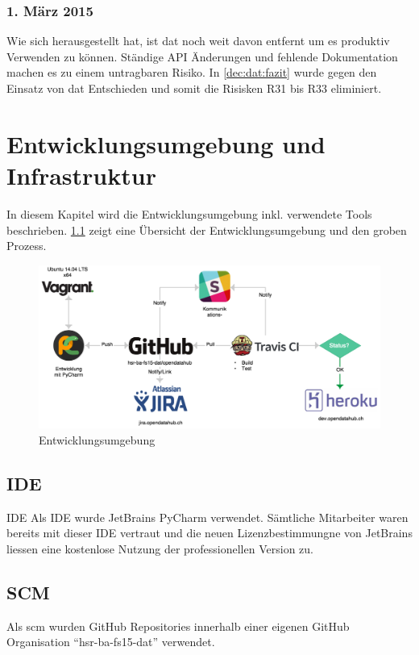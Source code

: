 \subsection{1. März 2015}

Wie sich herausgestellt hat, ist \gls{dat} noch weit davon entfernt um es produktiv Verwenden zu können. Ständige API Änderungen und fehlende Dokumentation machen es zu einem untragbaren Risiko. In \vref{dec:dat:fazit} wurde gegen den Einsatz von \gls{dat} Entschieden und somit die Risisken R31 bis R33 eliminiert.



\chapter{Entwicklungsumgebung und Infrastruktur}
In diesem Kapitel wird die Entwicklungsumgebung inkl. verwendete Tools beschrieben. \cref{fig:pm:entwicklungsumgebung} zeigt eine Übersicht der Entwicklungsumgebung und den groben Prozess.

\begin{figure}[H]
	\centering
	\includegraphics[width=\linewidth]{fig/entwicklungsumgebung}
	\caption{Entwicklungsumgebung}
	\label{fig:pm:entwicklungsumgebung}
\end{figure}

\section{IDE}
\begin{decision}{IDE}
	Als IDE wurde JetBrains PyCharm verwendet. Sämtliche Mitarbeiter waren bereits mit dieser IDE vertraut und die neuen Lizenzbestimmungne von JetBrains liessen eine kostenlose Nutzung der professionellen Version zu.

\end{decision}
\section{SCM}
Als \gls{scm} wurden GitHub Repositories innerhalb einer eigenen GitHub Organisation ``hsr-ba-fs15-dat'' verwendet.


